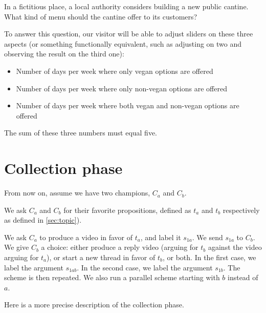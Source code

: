 \documentclass[version=3.21, pagesize, twoside=off, bibliography=totoc, DIV=calc, fontsize=12pt, a4paper]{scrartcl}
\begin{document}
In a fictitious place, a local authority considers building a new public cantine. What kind of menu should the cantine offer to its customers?

To answer this question, our visitor will be able to adjust sliders on these three aspects (or something functionally equivalent, such as adjusting on two and observing the result on the third one):
\begin{itemize}
	\item Number of days per week where only vegan options are offered
	\item Number of days per week where only non-vegan options are offered 
	\item Number of days per week where both vegan and non-vegan options are offered
\end{itemize}
The sum of these three numbers must equal five.

\section{Collection phase}
From now on, assume we have two champions, $C_a$ and $C_b$.

We ask $C_a$ and $C_b$ for their favorite propositions, defined as $t_a$ and $t_b$ respectively as defined in \cref{sec:topic}). 

We ask $C_a$ to produce a video in favor of $t_a$, and label it $s_{1a}$. We send $s_{1a}$ to $C_b$. We give $C_b$ a choice: either produce a reply video (arguing for $t_b$ against the video arguing for $t_a$), or start a new thread in favor of $t_b$, or both. In the first case, we label the argument $s_{1ab}$. In the second case, we label the argument $s_{1b}$. The scheme is then repeated. We also run a parallel scheme starting with $b$ instead of $a$.

Here is a more precise description of the collection phase.
\end{document}
